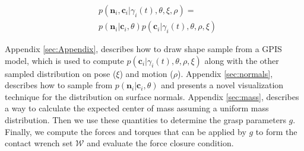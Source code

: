 \documentclass[journal,transmag]{IEEEtran}%
\newcommand{\mW}{\mathcal{W}}
\begin{document}
 \vspace{-2ex}
 \begin{align*}
 &p(\textbf{n}_i,\textbf{c}_i |\gamma_i(t),\theta,\xi,\rho)=\\
 &p(\textbf{n}_i|\textbf{c}_i,\theta)p(\textbf{c}_i|\gamma_i(t),\theta,\rho,\xi)
 \end{align*}

 
Appendix \ref{sec:Appendix}, describes how to draw shape sample from a GPIS model, which is used to compute $p(\textbf{c}_i|\gamma_i(t),\theta,\rho,\xi)$ along with the other sampled distribution on pose ($\xi$) and motion ($\rho$). Appendix \ref{sec:normals}, describes how to sample from $p(\textbf{n}_i|\textbf{c}_i,\theta)$ and presents a novel visualization technique for the distribution on surface normals.  Appendix \ref{sec:mass}, describes a way to calculate the expected center of mass assuming a uniform mass distribution. Then we use these quantities to determine the grasp parameters $g$. Finally, we compute the forces and torques that can be applied by $g$ to form the contact wrench set $\mW$ and evaluate the force closure condition.


%
\end{document}
